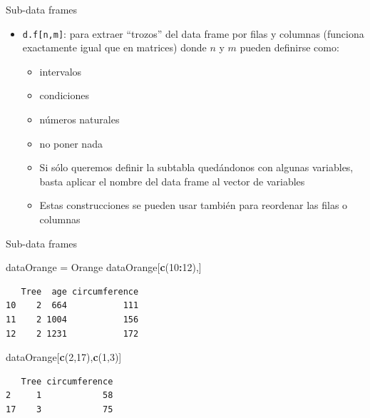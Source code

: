 \documentclass[
  ignorenonframetext,
]{beamer}
\newenvironment{Shaded}{\begin{snugshade}}{\end{snugshade}}
\newcommand{\DecValTok}[1]{\textcolor[rgb]{0.00,0.00,0.81}{#1}}
\newcommand{\FunctionTok}[1]{\textcolor[rgb]{0.13,0.29,0.53}{\textbf{#1}}}
\newcommand{\NormalTok}[1]{#1}
\newcommand{\OtherTok}[1]{\textcolor[rgb]{0.56,0.35,0.01}{#1}}
\newcommand{\SpecialCharTok}[1]{\textcolor[rgb]{0.81,0.36,0.00}{\textbf{#1}}}
\providecommand{\tightlist}{%
  \setlength{\itemsep}{0pt}\setlength{\parskip}{0pt}}
\begin{document}
\begin{frame}[fragile]{Sub-data frames}
\label{sub-data-frames}
\begin{itemize}
\tightlist
\item
  \texttt{d.f{[}n,m{]}}: para extraer ``trozos'' del data frame por
  filas y columnas (funciona exactamente igual que en matrices) donde
  \(n\) y \(m\) pueden definirse como:

  \begin{itemize}
  \tightlist
  \item
    intervalos
  \item
    condiciones
  \item
    números naturales
  \item
    no poner nada
  \item
    Si sólo queremos definir la subtabla quedándonos con algunas
    variables, basta aplicar el nombre del data frame al vector de
    variables
  \item
    Estas construcciones se pueden usar también para reordenar las filas
    o columnas
  \end{itemize}
\end{itemize}
\end{frame}

\begin{frame}[fragile]{Sub-data frames}
\label{sub-data-frames-1}
\begin{Shaded}
\begin{Highlighting}[]
\NormalTok{dataOrange }\OtherTok{=}\NormalTok{ Orange}
\NormalTok{dataOrange[}\FunctionTok{c}\NormalTok{(}\DecValTok{10}\SpecialCharTok{:}\DecValTok{12}\NormalTok{),]}
\end{Highlighting}
\end{Shaded}

\begin{verbatim}
   Tree  age circumference
10    2  664           111
11    2 1004           156
12    2 1231           172
\end{verbatim}

\begin{Shaded}
\begin{Highlighting}[]
\NormalTok{dataOrange[}\FunctionTok{c}\NormalTok{(}\DecValTok{2}\NormalTok{,}\DecValTok{17}\NormalTok{),}\FunctionTok{c}\NormalTok{(}\DecValTok{1}\NormalTok{,}\DecValTok{3}\NormalTok{)]}
\end{Highlighting}
\end{Shaded}

\begin{verbatim}
   Tree circumference
2     1            58
17    3            75
\end{verbatim}
\end{frame}
\end{document}
